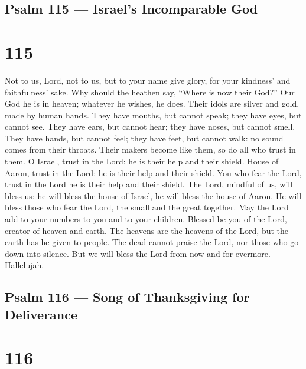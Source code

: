 \hypertarget{psalm-115-israels-incomparable-god}{%
\subsection{Psalm 115 --- Israel's Incomparable
God}\label{psalm-115-israels-incomparable-god}}

\hypertarget{section-114}{%
\section{115}\label{section-114}}

 Not to us, Lord, not to us, but to your name give glory,
for your kindness' and faithfulness' sake.  Why should the
heathen say, ``Where is now their God?''  Our God he is in
heaven; whatever he wishes, he does.  Their idols are silver
and gold, made by human hands.  They have mouths, but cannot
speak; they have eyes, but cannot see.  They have ears, but
cannot hear; they have noses, but cannot smell.  They have
hands, but cannot feel; they have feet, but cannot walk: no sound comes
from their throats.  Their makers become like them, so do
all who trust in them.  O Israel, trust in the Lord: he is
their help and their shield.  House of Aaron, trust in the
Lord: he is their help and their shield.  You who fear the
Lord, trust in the Lord he is their help and their shield. 
The Lord, mindful of us, will bless us: he will bless the house of
Israel, he will bless the house of Aaron.  He will bless
those who fear the Lord, the small and the great together. 
May the Lord add to your numbers to you and to your children.
 Blessed be you of the Lord, creator of heaven and earth.
 The heavens are the heavens of the Lord, but the earth has
he given to people.  The dead cannot praise the Lord, nor
those who go down into silence.  But we will bless the Lord
from now and for evermore. Hallelujah.

\hypertarget{psalm-116-song-of-thanksgiving-for-deliverance}{%
\subsection{Psalm 116 --- Song of Thanksgiving for
Deliverance}\label{psalm-116-song-of-thanksgiving-for-deliverance}}

\hypertarget{section-115}{%
\section{116}\label{section-115}}

